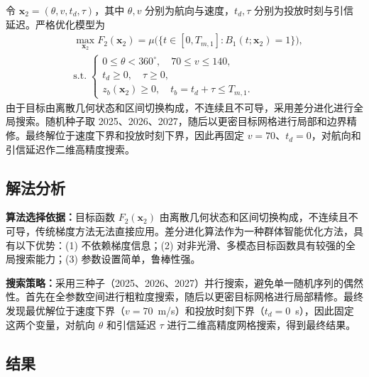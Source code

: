 \documentclass[12pt,a4paper]{article}
\begin{document}
令 $\boldsymbol x_2=(\theta,v,t_d,\tau)$，其中 $\theta,v$ 分别为航向与速度，$t_d,\tau$ 分别为投放时刻与引信延迟。严格优化模型为
\begin{equation}
\begin{aligned}
&\max_{\boldsymbol x_2} F_2(\boldsymbol x_2)
=\mu\bigl(\{t\in[0,T_{m,1}]:B_1(t;\boldsymbol x_2)=1\}\bigr), \\[6pt]
&\mathrm{s.t.}\; \left\{\begin{array}{l}
0\le\theta<360^\circ,\quad 70\le v\le140, \\
t_d\ge0,\quad \tau\ge0, \\
z_b(\boldsymbol x_2)\ge0,\quad t_b=t_d+\tau\le T_{m,1}.
\end{array}\right.
\end{aligned}
\label{eq:q2-model}
\end{equation}
由于目标由离散几何状态和区间切换构成，不连续且不可导，采用差分进化进行全局搜索\cite{storn1997}。随机种子取 2025、2026、2027，随后以更密目标网格进行局部和边界精修。最终解位于速度下界和投放时刻下界，因此再固定 $v=70$、$t_d=0$，对航向和引信延迟作二维高精度搜索。

\subsection{解法分析}

\textbf{算法选择依据：}目标函数 $F_2(\boldsymbol x_2)$ 由离散几何状态和区间切换构成，不连续且不可导，传统梯度方法无法直接应用。差分进化算法\cite{storn1997}作为一种群体智能优化方法，具有以下优势：(1) 不依赖梯度信息；(2) 对非光滑、多模态目标函数具有较强的全局搜索能力；(3) 参数设置简单，鲁棒性强。

\textbf{搜索策略：}采用三种子（2025、2026、2027）并行搜索，避免单一随机序列的偶然性。首先在全参数空间进行粗粒度搜索，随后以更密目标网格进行局部精修。最终发现最优解位于速度下界（$v=70$~m/s）和投放时刻下界（$t_d=0$~s），因此固定这两个变量，对航向 $\theta$ 和引信延迟 $\tau$ 进行二维高精度网格搜索，得到最终结果。

\subsection{结果}

\begin{table}[H]
\centering
\caption{问题二当前最优已知数值策略}
\label{tab:q2-result}
\end{table}
\end{document}
